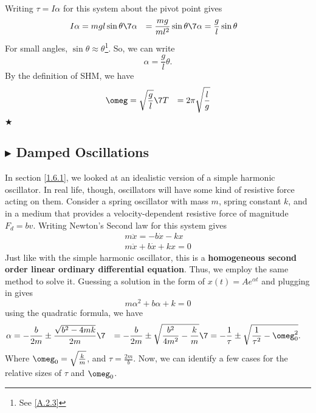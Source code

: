 \noindent Writing $\tau = I\alpha$ for this system about the pivot point gives
\begin{align}
    I\alpha &= mgl\sin\theta \7
    \alpha &= \frac{mg}{ml^2}\sin\theta \7
    \alpha &= \frac{g}{l}\sin\theta
\end{align}
\noindent For small angles, $\sin\theta \approx \theta$\footnote{See \ref{A.2.3}}. So, we can write 
\begin{equation*}
    \alpha = \frac{g}{l}\theta.
\end{equation*}
\noindent By the definition of SHM, we have
\begin{align}
    \omeg &= \sqrt{\frac{g}{l}} \7
    T &= 2\pi\sqrt{\frac{l}{g}}
\end{align}
$\bigstar$

%
%
\subsection{\color{Orchid} $\blacktriangleright$ \color{black} Damped Oscillations} \label{1.6.4}
In section \ref{1.6.1}, we looked at an idealistic version of a simple harmonic oscillator. In real life, though, oscillators will have some kind of resistive force acting on them. Consider a spring oscillator with mass $m$, spring constant $k$, and in a medium that provides a velocity-dependent resistive force of magnitude $F_d = bv$. Writing Newton's Second law for this system gives
\begin{gather*}
    m\ddot{x} = -b\dot{x} -kx \\
    m\ddot{x} + b\dot{x} + kx = 0
\end{gather*}
\noindent Just like with the simple harmonic oscillator, this is a \textbf{homogeneous second order linear ordinary differential equation}. Thus, we employ the same method to solve it. Guessing a solution in the form of $x(t) = Ae^{\alpha t}$ and plugging in gives
\begin{equation}
    m\alpha^2 + b\alpha + k = 0
\end{equation}
\noindent using the quadratic formula, we have
\begin{align}
    \alpha &= -\frac{b}{2m} \pm \frac{\sqrt{b^2-4mk}}{2m} \7
    &= -\frac{b}{2m} \pm \sqrt{\frac{b^2}{4m^2} - \frac{k}{m}} \7
    &= -\frac{1}{\tau} \pm \sqrt{\frac{1}{\tau^2} - \omeg_0^2}.
\end{align}
\noindent Where $\omeg_0 = \sqrt{\frac{k}{m}}$, and $\tau = \frac{2m}{b}$. Now, we can identify a few cases for the relative sizes of $\tau$ and $\omeg_0$. 

